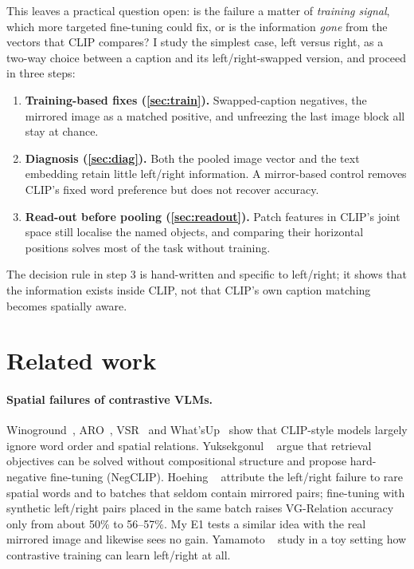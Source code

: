 \documentclass[10pt,twocolumn,letterpaper]{article}
\begin{document}
This leaves a practical question open: is the failure a matter of \emph{training signal}, which more targeted fine-tuning could fix, or is the information \emph{gone} from the vectors that CLIP compares?
I study the simplest case, left versus right, as a two-way choice between a caption and its left/right-swapped version, and proceed in three steps:
\begin{enumerate}
\setlength\itemsep{0pt}
\item \textbf{Training-based fixes (\cref{sec:train}).} Swapped-caption negatives, the mirrored image as a matched positive, and unfreezing the last image block all stay at chance.
\item \textbf{Diagnosis (\cref{sec:diag}).} Both the pooled image vector and the text embedding retain little left/right information. A mirror-based control removes CLIP's fixed word preference but does not recover accuracy.
\item \textbf{Read-out before pooling (\cref{sec:readout}).} Patch features in CLIP's joint space still localise the named objects, and comparing their horizontal positions solves most of the task without training.
\end{enumerate}
The decision rule in step 3 is hand-written and specific to left/right; it shows that the information exists inside CLIP, not that CLIP's own caption matching becomes spatially aware.

\section{Related work}
\label{sec:related}

\paragraph{Spatial failures of contrastive VLMs.}
Winoground~\cite{thrush2022winoground}, ARO~\cite{yuksekgonul2023aro}, VSR~\cite{liu2023vsr} and What'sUp~\cite{kamath2023whatsup} show that CLIP-style models largely ignore word order and spatial relations.
Yuksekgonul \etal~\cite{yuksekgonul2023aro} argue that retrieval objectives can be solved without compositional structure and propose hard-negative fine-tuning (NegCLIP).
Hoehing \etal~\cite{hoehing2023left} attribute the left/right failure to rare spatial words and to batches that seldom contain mirrored pairs; fine-tuning with synthetic left/right pairs placed in the same batch raises VG-Relation accuracy only from about 50\% to 56--57\%.
My E1 tests a similar idea with the real mirrored image and likewise sees no gain.
Yamamoto \etal~\cite{yamamoto2026symmetry} study in a toy setting how contrastive training can learn left/right at all.
\end{document}
